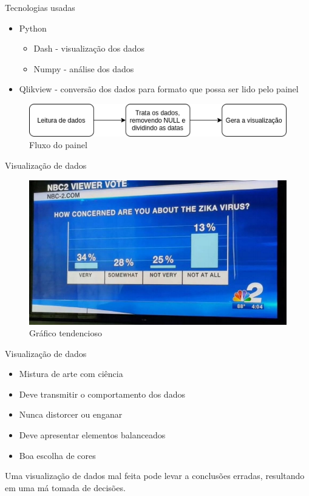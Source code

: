 \documentclass[10pt,t]{beamer}
\begin{document}
\begin{frame}{Tecnologias usadas}
\vspace{8pt}
    \begin{itemize}
        \item Python
        \begin{itemize}
            \item Dash - visualização dos dados
            \item Numpy - análise dos dados
        \end{itemize}
        \item Qlikview - conversão dos dados para formato que possa ser lido pelo painel
    \end{itemize}
	\begin{figure}
		\centering
		\includegraphics[scale=0.60]{./imagens/fluxo_painel.png}
		\caption{Fluxo do painel}
	\end{figure}
\end{frame}


\begin{frame}{Visualização de dados}
	\vspace{8pt}
	\begin{figure}
		\centering
		\includegraphics[scale=0.35]{./imagens/grafico_errado.jpeg}
		\caption{Gráfico tendencioso}
	\end{figure}
\end{frame}

\begin{frame}{Visualização de dados}
	\vspace{8pt}
	\begin{itemize}
		\item Mistura de arte com ciência
		\item Deve transmitir o comportamento dos dados
		\item Nunca distorcer ou enganar
		\item Deve apresentar elementos balanceados %
		\item Boa escolha de cores
	\end{itemize}

	Uma visualização de dados mal feita pode levar a conclusões erradas, resultando em uma má tomada de decisões.
\end{frame}
\end{document}
